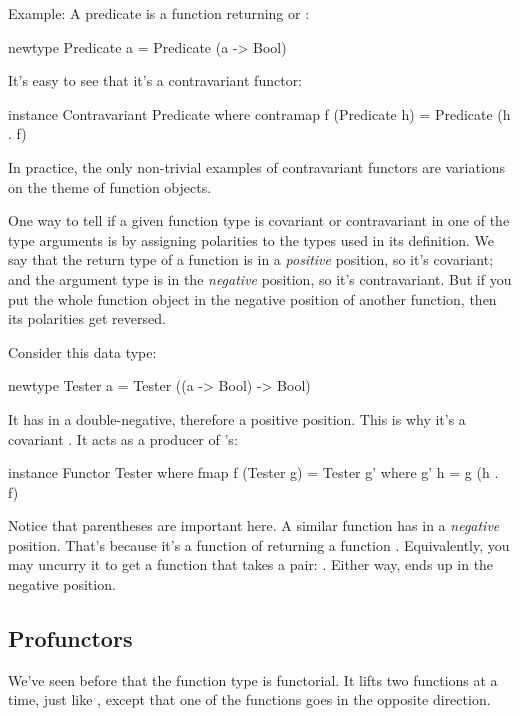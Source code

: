\documentclass[DaoFP]{subfiles}
\begin{document}
Example: A predicate is a function returning  or :
\begin{haskell}
newtype Predicate a = Predicate (a -> Bool)
\end{haskell}
It's easy to see that it's a contravariant functor:
\begin{haskell}
instance Contravariant Predicate where
  contramap f (Predicate h) = Predicate (h . f)
\end{haskell}

In practice, the only non-trivial examples of contravariant functors are variations on the theme of function objects. 

One way to tell if a given function type is covariant or contravariant in one of the type arguments is by assigning polarities to the types used in its definition. We say that the return type of a function is in a \emph{positive} position, so it's covariant; and the argument type is in the \emph{negative} position, so it's contravariant. But if you put the whole function object in the negative position of another function, then its polarities get reversed. 

Consider this data type:
\begin{haskell}
newtype Tester a = Tester ((a -> Bool) -> Bool)
\end{haskell}
It has  in a double-negative, therefore a positive position. This is why it's a covariant . It acts as a producer of 's:

\begin{haskell}
instance Functor Tester where
  fmap f (Tester g) = Tester g'
    where g' h = g (h . f)
\end{haskell}

Notice that parentheses are important here. A similar function  has  in a \emph{negative} position. That's because it's a function of  returning a function . Equivalently, you may uncurry it to get a function that takes a pair: . Either way,  ends up in the negative position.

\subsection{Profunctors}

We've seen before that the function type is functorial. It lifts two functions at a time, just like , except that one of the functions goes in the opposite direction. 
\end{document}
